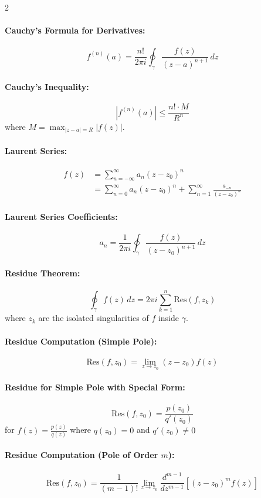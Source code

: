 \begin{multicols}{2}
\paragraph{Cauchy's Formula for Derivatives:}
\[
f^{(n)}(a) = \frac{n!}{2\pi i} \oint_{\gamma} \frac{f(z)}{(z-a)^{n+1}} \, dz
\]

\paragraph{Cauchy's Inequality:}
\[
|f^{(n)}(a)| \leq \frac{n! \cdot M}{R^n}
\]
where $M = \max_{|z-a|=R} |f(z)|$.

\paragraph{Laurent Series:}
\begin{align*}
f(z) &= \sum_{n=-\infty}^{\infty} a_n (z - z_0)^n \\
&= \sum_{n=0}^{\infty} a_n (z - z_0)^n + \sum_{n=1}^{\infty} \frac{a_{-n}}{(z - z_0)^n}
\end{align*}

\paragraph{Laurent Series Coefficients:}
\[
a_n = \frac{1}{2\pi i} \oint_{\gamma} \frac{f(z)}{(z - z_0)^{n+1}} \, dz
\]

\paragraph{Residue Theorem:}
\[
\oint_{\gamma} f(z) \, dz = 2\pi i \sum_{k=1}^{n} \text{Res}(f, z_k)
\]
where $z_k$ are the isolated singularities of $f$ inside $\gamma$.

\paragraph{Residue Computation (Simple Pole):}
\[
\text{Res}(f, z_0) = \lim_{z \to z_0} (z - z_0)f(z)
\]

\paragraph{Residue for Simple Pole with Special Form:}
\[
\text{Res}(f, z_0) = \frac{p(z_0)}{q'(z_0)}
\]
for $f(z) = \frac{p(z)}{q(z)}$ where $q(z_0) = 0$ and $q'(z_0) \neq 0$

\paragraph{Residue Computation (Pole of Order $m$):}
\[
\text{Res}(f, z_0) = \frac{1}{(m-1)!} \lim_{z \to z_0} \frac{d^{m-1}}{dz^{m-1}} [(z - z_0)^m f(z)]
\]


\end{multicols}
